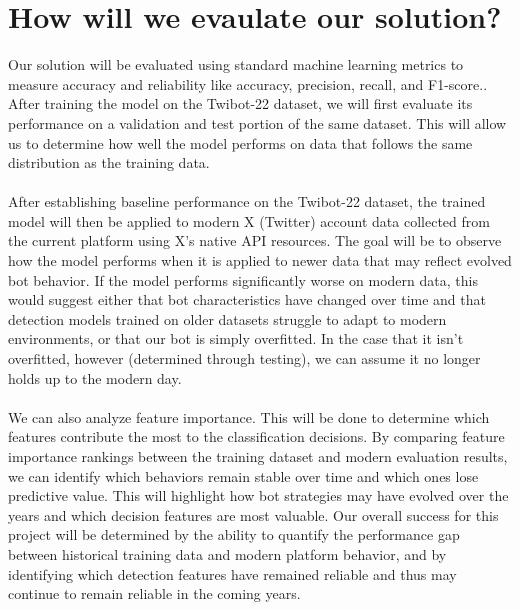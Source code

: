 \section{How will we evaulate our solution?}
Our solution will be evaluated using standard machine learning metrics to measure accuracy and reliability like accuracy, precision, recall, and F1-score.. After training the model on the Twibot-22 dataset, we will first evaluate its performance on a validation and test portion of the same dataset. This will allow us to determine how well the model performs on data that follows the same distribution as the training data. 
\\\\
After establishing baseline performance on the Twibot-22 dataset, the trained model will then be applied to modern X (Twitter) account data collected from the current platform using X’s native API resources. The goal will be to observe how the model performs when it is applied to newer data that may reflect evolved bot behavior. If the model performs significantly worse on modern data, this would suggest either that bot characteristics have changed over time and that detection models trained on older datasets struggle to adapt to modern environments, or that our bot is simply overfitted. In the case that it isn’t overfitted, however (determined through testing), we can assume it no longer holds up to the modern day.
\\\\
We can also analyze feature importance. This will be done to determine which features contribute the most to the classification decisions. By comparing feature importance rankings between the training dataset and modern evaluation results, we can identify which behaviors remain stable over time and which ones lose predictive value. This will highlight how bot strategies may have evolved over the years and which decision features are most valuable. Our overall success for this project will be determined by the ability to quantify the performance gap between historical training data and modern platform behavior, and by identifying which detection features have remained reliable and thus may continue to remain reliable in the coming years.






